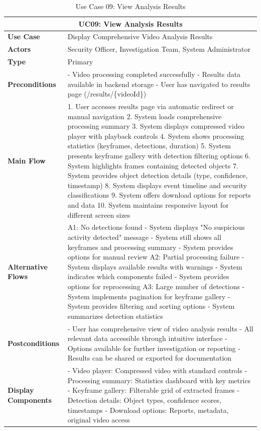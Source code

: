 \documentclass{article}
\begin{document}
\begin{table}[H]
\centering
\begin{tabularx}{\textwidth}{|l|X|}
\hline
\multicolumn{2}{|c|}{\textbf{UC09: View Analysis Results}} \\ \hline
\textbf{Use Case} & Display Comprehensive Video Analysis Results \\ \hline
\textbf{Actors} & Security Officer, Investigation Team, System Administrator \\ \hline
\textbf{Type} & Primary \\ \hline
\textbf{Preconditions} & 
- Video processing completed successfully
- Results data available in backend storage
- User has navigated to results page (/results/\{videoId\}) \\ \hline
\textbf{Main Flow} & 
1. User accesses results page via automatic redirect or manual navigation
2. System loads comprehensive processing summary
3. System displays compressed video player with playback controls
4. System shows processing statistics (keyframes, detections, duration)
5. System presents keyframe gallery with detection filtering options
6. System highlights frames containing detected objects
7. System provides object detection details (type, confidence, timestamp)
8. System displays event timeline and security classifications
9. System offers download options for reports and data
10. System maintains responsive layout for different screen sizes \\ \hline
\textbf{Alternative Flows} & 
A1: No detections found
- System displays "No suspicious activity detected" message
- System still shows all keyframes and processing summary
- System provides options for manual review
A2: Partial processing failure
- System displays available results with warnings
- System indicates which components failed
- System provides options for reprocessing
A3: Large number of detections
- System implements pagination for keyframe gallery
- System provides filtering and sorting options
- System summarizes detection statistics \\ \hline
\textbf{Postconditions} & 
- User has comprehensive view of video analysis results
- All relevant data accessible through intuitive interface
- Options available for further investigation or reporting
- Results can be shared or exported for documentation \\ \hline
\textbf{Display Components} & 
- Video player: Compressed video with standard controls
- Processing summary: Statistics dashboard with key metrics
- Keyframe gallery: Filterable grid of extracted frames
- Detection details: Object types, confidence scores, timestamps
- Download options: Reports, metadata, original video access \\ \hline
\end{tabularx}
\caption{Use Case 09: View Analysis Results}
\end{table}
\end{document}

